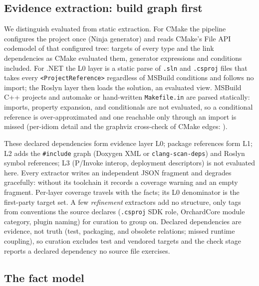 \subsection{Evidence extraction: build graph first}
\label{sec:evidence}

We distinguish evaluated from static extraction. For CMake the pipeline configures the project
once (Ninja generator) and reads CMake's File API codemodel of that configured tree: targets of
every type and the link dependencies as CMake evaluated them, generator expressions and conditions
included. For .NET the L0 layer is a static parse of \texttt{.sln} and \texttt{.csproj} files that
takes every \texttt{<ProjectReference>} regardless of MSBuild conditions and follows no import;
the Roslyn layer then loads the solution, an evaluated view. MSBuild C++ projects and automake or
hand-written \texttt{Makefile.in} are parsed statically: imports, property expansion, and
conditionals are not evaluated, so a conditional reference is over-approximated and one reachable
only through an import is missed (per-idiom detail and the graphviz cross-check of CMake edges:
\trExtract{}).

These declared dependencies form evidence layer L0; package references form L1; L2 adds the
\texttt{\#include} graph (Doxygen XML or \texttt{clang-scan-deps}) and Roslyn symbol references;
L3 (P/Invoke interop, deployment descriptors) is not evaluated here. Every extractor writes an
independent JSON fragment and degrades gracefully: without its toolchain it records a coverage
warning and an empty fragment. Per-layer coverage travels with the facts; its L0 denominator is
the first-party target set. A few \emph{refinement} extractors add no structure, only tags from
conventions the source declares (\texttt{.csproj} SDK role, OrchardCore module category, plugin
naming) for curation to group on. Declared dependencies are evidence, not truth (test, packaging,
and obsolete relations; missed runtime coupling), so curation excludes test and vendored targets
and the check stage reports a declared dependency no source file exercises.

\subsection{The fact model}
\label{sec:factmodel}

